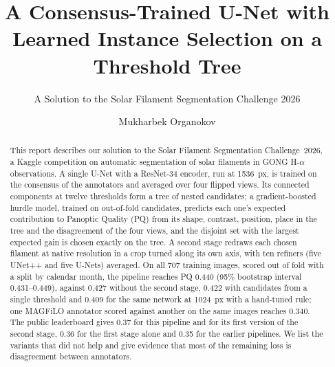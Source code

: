 \documentclass[sigconf]{acmart}
\begin{document}
\title{A Consensus-Trained U-Net with Learned Instance Selection on a Threshold Tree}  %
\subtitle{A Solution to the Solar Filament Segmentation Challenge 2026} %


\author{Mukharbek Organokov}

\begin{abstract}
    This report describes our solution to the Solar Filament Segmentation Challenge~2026, a Kaggle competition on automatic segmentation of solar filaments in GONG H-$\alpha$ observations. A single U-Net with a ResNet-34 encoder, run at 1536~px, is trained on the consensus of the annotators and averaged over four flipped views. Its connected components at twelve thresholds form a tree of nested candidates; a gradient-boosted hurdle model, trained on out-of-fold candidates, predicts each one's expected contribution to Panoptic Quality (PQ) from its shape, contrast, position, place in the tree and the disagreement of the four views, and the disjoint set with the largest expected gain is chosen exactly on the tree. A second stage redraws each chosen filament at native resolution in a crop turned along its own axis, with ten refiners (five UNet++ and five U-Nets) averaged. On all 707 training images, scored out of fold with a split by calendar month, the pipeline reaches PQ 0.440 (95\% bootstrap interval 0.431--0.449), against 0.427 without the second stage, 0.422 with candidates from a single threshold and 0.409 for the same network at 1024~px with a hand-tuned rule; one MAGFiLO annotator scored against another on the same images reaches 0.340. The public leaderboard gives 0.37 for this pipeline and for its first version of the second stage, 0.36 for the first stage alone and 0.35 for the earlier pipelines. We list the variants that did not help and give evidence that most of the remaining loss is disagreement between annotators.
\end{abstract}

\maketitle

\ifguideStyle
{}
\par\medskip
\fi



\end{document}
